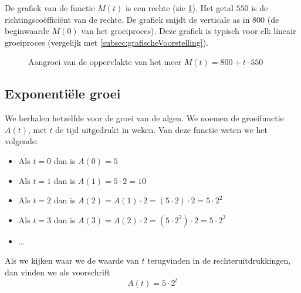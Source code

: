 De grafiek van de functie $M(t)$ is een rechte (zie \cref{fig:lingroei}). Het getal $550$ is de richtingsco\"effici\"ent van de rechte. De grafiek snijdt de verticale as in $800$ (de beginwaarde $M(0)$ van het groeiproces).   Deze grafiek is typisch voor elk lineair groeiproces (vergelijk met \cref{subsec:grafischeVoorstelling}).
\begin{figure}[tbp]
    \centering
{}
    \caption{Aangroei van de oppervlakte van het meer $M(t)=800+t\cdot 550$}
    \label{fig:lingroei}
\end{figure}

\subsection{Exponenti\"{e}le groei}
\label{subsec:exp_groei_vb}
We herhalen hetzelfde voor de groei van de algen. We
noemen de groeifunctie $A(t)$,
met $t$ de tijd uitgedrukt in weken.
Van deze functie weten we het volgende:
\begin{itemize}
    \item  Als $t=0$ dan is $A(0)=5$

    \item  Als $t=1$ dan is $A(1)=5\cdot 2=10$

    \item  Als $t=2$ dan is $A(2)=A(1)\cdot 2=(5\cdot 2)\cdot 2=5\cdot 2^{2}$

    \item  Als $t=3$ dan is $A(3)=A(2)\cdot 2=(5\cdot 2^{2})\cdot 2=5\cdot 2^{3}$

    \item  \ldots
\end{itemize}
Als we kijken waar we de waarde van $t$ terugvinden in de
rechteruitdrukkingen, dan vinden we als voorschrift
\begin{equation}
    A(t)=5\cdot 2^{t}
    \label{eq:algen}
\end{equation}



